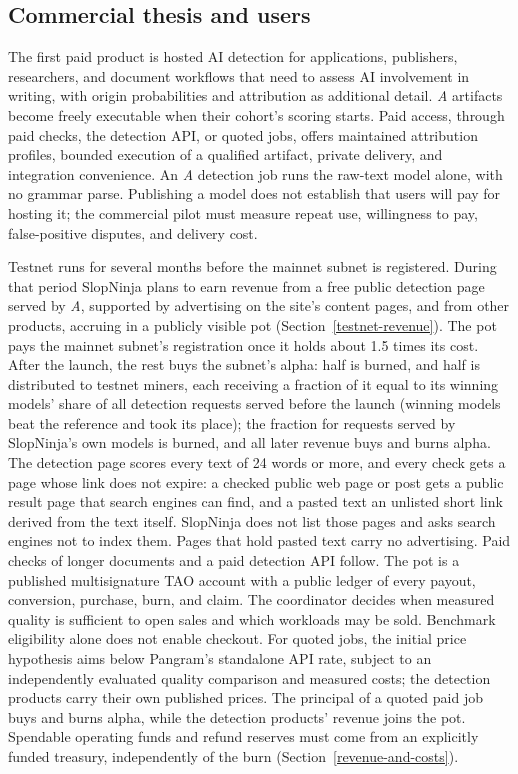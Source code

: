 \subsection{Commercial thesis and users}\label{commercial-thesis}

The first paid product is hosted AI detection for applications, publishers,
researchers, and document workflows that need to assess AI involvement in
writing, with origin probabilities and attribution as additional detail.
\textit{A} artifacts become freely executable when their cohort's scoring starts. Paid
access, through paid checks, the detection API, or quoted jobs, offers maintained attribution profiles, bounded execution of a qualified
artifact, private delivery, and integration convenience. An \textit{A} detection job
runs the raw-text model alone, with no grammar parse. Publishing a model does not establish
that users will pay for hosting it; the commercial pilot must measure repeat
use, willingness to pay, false-positive disputes, and delivery cost.

Testnet runs for several months before the mainnet subnet is registered.
During that period SlopNinja plans to earn revenue from a free public
detection page served by \textit{A}, supported by advertising on the site's
content pages, and from other products, accruing in a publicly visible pot
(Section~\ref{testnet-revenue}).
The pot pays the mainnet subnet's registration once it holds about 1.5 times
its cost. After the launch, the rest buys the subnet's alpha: half is burned,
and half is distributed to testnet miners, each receiving a fraction of it
equal to its winning models' share of all detection requests served before
the launch (winning models beat the reference and took its place); the
fraction for requests served by SlopNinja's own models is burned, and all
later revenue buys and burns alpha.
The detection page scores every text of 24 words or more, and every check
gets a page whose link does not expire: a checked public web page or post gets
a public result page that search engines can find, and a pasted text an
unlisted short link derived from the text itself. SlopNinja does not list those
pages and asks search engines not to index them. Pages that hold pasted text
carry no advertising. Paid checks of longer documents and a paid
detection API follow. The pot is a published multisignature TAO account with a public
ledger of every payout, conversion, purchase, burn, and claim.
The coordinator decides when measured quality is sufficient to open sales and
which workloads may be sold. Benchmark eligibility alone does not enable
checkout. For quoted jobs, the initial price hypothesis aims below Pangram's
standalone API rate, subject to an independently evaluated quality comparison
and measured costs; the detection products carry their own published prices.
The principal of a quoted paid job buys and burns alpha, while the detection
products' revenue joins the pot. Spendable operating
funds and refund reserves must come from an explicitly funded treasury,
independently of the burn (Section~\ref{revenue-and-costs}).


